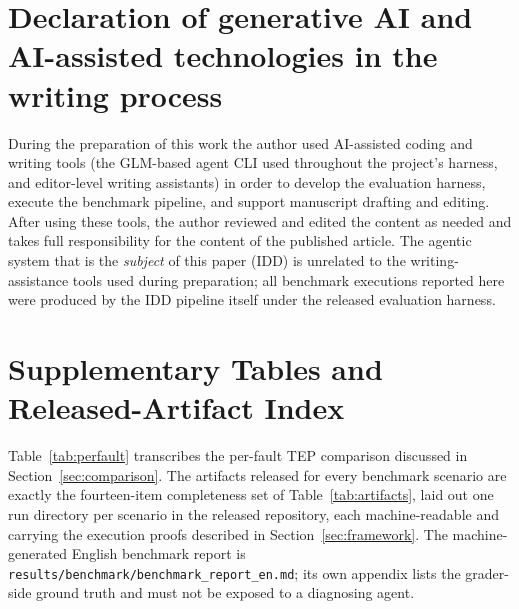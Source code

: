 \documentclass[preprint,10pt]{elsarticle}
\begin{document}
\section*{Declaration of generative AI and AI-assisted technologies in the writing process}
During the preparation of this work the author used AI-assisted coding and writing tools (the GLM-based agent CLI used throughout the project's harness, and editor-level writing assistants) in order to develop the evaluation harness, execute the benchmark pipeline, and support manuscript drafting and editing. After using these tools, the author reviewed and edited the content as needed and takes full responsibility for the content of the published article. The agentic system that is the \emph{subject} of this paper (IDD) is unrelated to the writing-assistance tools used during preparation; all benchmark executions reported here were produced by the IDD pipeline itself under the released evaluation harness.




\appendix

\section{Supplementary Tables and Released-Artifact Index}\label{app:artifacts}

\setcounter{table}{0}
\renewcommand{\thetable}{A\arabic{table}}
\renewcommand{\theHtable}{A\arabic{table}}

Table~\ref{tab:perfault} transcribes the per-fault TEP comparison discussed in
Section~\ref{sec:comparison}. The artifacts released for every benchmark scenario are exactly
the fourteen-item completeness set of Table~\ref{tab:artifacts}, laid out one run directory
per scenario in the released repository, each machine-readable and carrying the execution
proofs described in Section~\ref{sec:framework}. The machine-generated English benchmark
report is \texttt{results/benchmark/benchmark\_report\_en.md}; its own appendix lists the
grader-side ground truth and must not be exposed to a diagnosing agent.
\end{document}
